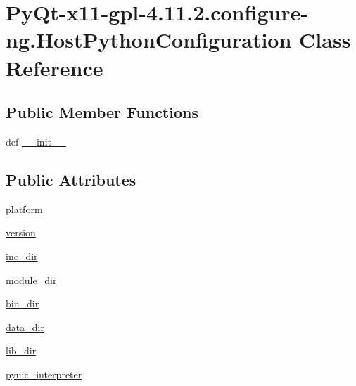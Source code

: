 \hypertarget{classPyQt-x11-gpl-4_811_82_1_1configure-ng_1_1HostPythonConfiguration}{}\section{Py\+Qt-\/x11-\/gpl-\/4.11.2.configure-\/ng.Host\+Python\+Configuration Class Reference}
\label{classPyQt-x11-gpl-4_811_82_1_1configure-ng_1_1HostPythonConfiguration}
\subsection*{Public Member Functions}
\begin{DoxyCompactItemize}
\item 
def \hyperlink{classPyQt-x11-gpl-4_811_82_1_1configure-ng_1_1HostPythonConfiguration_aab7320b9c3d2b033bcb0109f42c68b08}{\+\_\+\+\_\+init\+\_\+\+\_\+}
\end{DoxyCompactItemize}
\subsection*{Public Attributes}
\begin{DoxyCompactItemize}
\item 
\hyperlink{classPyQt-x11-gpl-4_811_82_1_1configure-ng_1_1HostPythonConfiguration_ac4586ff5cee884e9bd31a85866005e62}{platform}
\item 
\hyperlink{classPyQt-x11-gpl-4_811_82_1_1configure-ng_1_1HostPythonConfiguration_a9c2bce4e381b03ad1860d19197fabcd7}{version}
\item 
\hyperlink{classPyQt-x11-gpl-4_811_82_1_1configure-ng_1_1HostPythonConfiguration_aa9b3c704c99a6f766c6e2b2026a24a52}{inc\+\_\+dir}
\item 
\hyperlink{classPyQt-x11-gpl-4_811_82_1_1configure-ng_1_1HostPythonConfiguration_ada3f7e26bb6f40103be44712c5c2e740}{module\+\_\+dir}
\item 
\hyperlink{classPyQt-x11-gpl-4_811_82_1_1configure-ng_1_1HostPythonConfiguration_ae08a205b50338771946a6991d5df2c78}{bin\+\_\+dir}
\item 
\hyperlink{classPyQt-x11-gpl-4_811_82_1_1configure-ng_1_1HostPythonConfiguration_a9f2f22143704a5e1cc1a259d22441d38}{data\+\_\+dir}
\item 
\hyperlink{classPyQt-x11-gpl-4_811_82_1_1configure-ng_1_1HostPythonConfiguration_aef6a5c0826b996c5261bc29cbbff9d25}{lib\+\_\+dir}
\item 
\hyperlink{classPyQt-x11-gpl-4_811_82_1_1configure-ng_1_1HostPythonConfiguration_a7fe086568ca3b57ff2bd2d71c424d561}{pyuic\+\_\+interpreter}
\end{DoxyCompactItemize}


